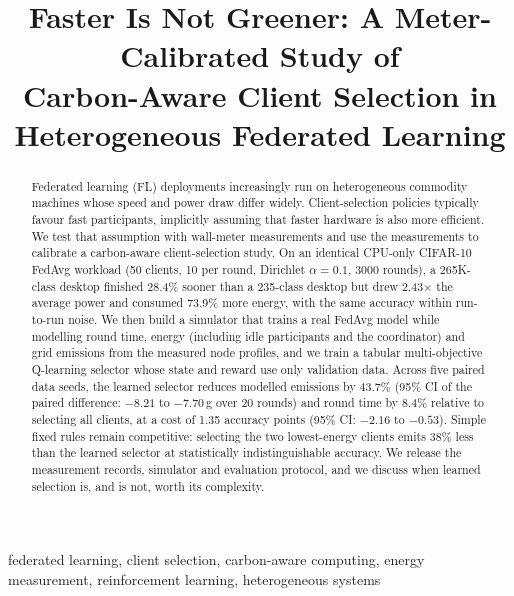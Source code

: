 \documentclass[conference]{IEEEtran}
\begin{document}
\title{Faster Is Not Greener: A Meter-Calibrated Study of\\
Carbon-Aware Client Selection in Heterogeneous Federated Learning}

\author{
}

\maketitle

\begin{abstract}
Federated learning (FL) deployments increasingly run on heterogeneous commodity machines whose speed and power draw differ widely. Client-selection policies typically favour fast participants, implicitly assuming that faster hardware is also more efficient. We test that assumption with wall-meter measurements and use the measurements to calibrate a carbon-aware client-selection study. On an identical CPU-only CIFAR-10 FedAvg workload (50 clients, 10 per round, Dirichlet $\alpha{=}0.1$, 3000 rounds), a 265K-class desktop finished 28.4\% sooner than a 235-class desktop but drew 2.43$\times$ the average power and consumed 73.9\% more energy, with the same accuracy within run-to-run noise. We then build a simulator that trains a real FedAvg model while modelling round time, energy (including idle participants and the coordinator) and grid emissions from the measured node profiles, and we train a tabular multi-objective Q-learning selector whose state and reward use only validation data. Across five paired data seeds, the learned selector reduces modelled emissions by 43.7\% (95\% CI of the paired difference: $-8.21$ to $-7.70$\,g over 20 rounds) and round time by 8.4\% relative to selecting all clients, at a cost of 1.35 accuracy points (95\% CI: $-2.16$ to $-0.53$). Simple fixed rules remain competitive: selecting the two lowest-energy clients emits 38\% less than the learned selector at statistically indistinguishable accuracy. We release the measurement records, simulator and evaluation protocol, and we discuss when learned selection is, and is not, worth its complexity.
\end{abstract}

\begin{IEEEkeywords}
federated learning, client selection, carbon-aware computing, energy measurement, reinforcement learning, heterogeneous systems
\end{IEEEkeywords}
\end{document}
